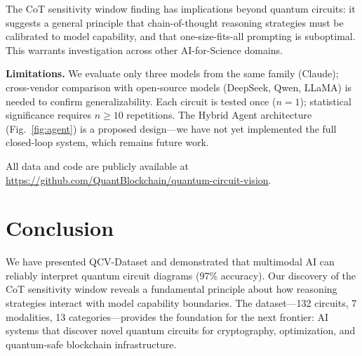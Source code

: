 \documentclass[conference]{IEEEtran}
\begin{document}
The CoT sensitivity window finding has implications beyond quantum circuits: it suggests a general principle that chain-of-thought reasoning strategies must be calibrated to model capability, and that one-size-fits-all prompting is suboptimal. This warrants investigation across other AI-for-Science domains.

\textbf{Limitations.} We evaluate only three models from the same family (Claude); cross-vendor comparison with open-source models (DeepSeek, Qwen, LLaMA) is needed to confirm generalizability. Each circuit is tested once ($n=1$); statistical significance requires $n \geq 10$ repetitions. The Hybrid Agent architecture (Fig.~\ref{fig:agent}) is a proposed design---we have not yet implemented the full closed-loop system, which remains future work.

All data and code are publicly available at \url{https://github.com/QuantBlockchain/quantum-circuit-vision}.

\section{Conclusion}

We have presented QCV-Dataset and demonstrated that multimodal AI can reliably interpret quantum circuit diagrams (97\% accuracy). Our discovery of the CoT sensitivity window reveals a fundamental principle about how reasoning strategies interact with model capability boundaries. The dataset---132 circuits, 7 modalities, 13 categories---provides the foundation for the next frontier: AI systems that discover novel quantum circuits for cryptography, optimization, and quantum-safe blockchain infrastructure.
\end{document}
